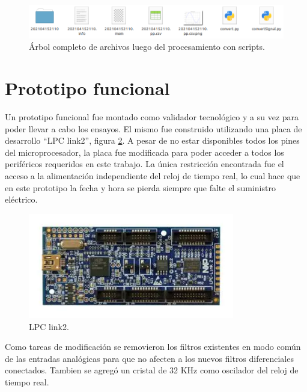 \vspace{5mm}

\begin{figure}[ht]
	\centering
	\includegraphics[width=140mm]{./Figures/firmAllFiles.png}
	\caption{Árbol completo de archivos luego del procesamiento con scripts.}
	\label{fig:firmAllFiles}
\end{figure}

\section{Prototipo funcional}

Un prototipo funcional fue montado como validador tecnológico y a su vez para poder llevar a cabo los ensayos. El mismo fue construido utilizando una placa de desarrollo \enquote{LPC link2}, figura \ref{fig:hardLPC}. A pesar de no estar disponibles todos los pines del microprocesador, la placa fue modificada para poder acceder a todos los periféricos requeridos en este trabajo. La única restricción encontrada fue el acceso a la alimentación independiente del reloj de tiempo real, lo cual hace que en este prototipo la fecha y hora se pierda siempre que falte el suministro eléctrico. 

\begin{figure}[ht]
	\centering
	\includegraphics[width=90mm]{./Figures/hardLPC.png}
	\caption{LPC link2.}
	\label{fig:hardLPC}
\end{figure}

\vspace{10mm}

Como tareas de modificación se removieron los filtros existentes en modo común de las entradas analógicas para que no afecten a los nuevos filtros diferenciales conectados. Tambien se agregó un cristal de 32 KHz como oscilador del reloj de tiempo real.

